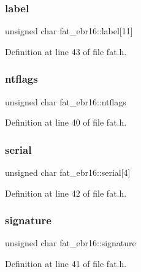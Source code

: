 \subsubsection{\texorpdfstring{label}{label}}
{\footnotesize\ttfamily unsigned char fat\+\_\+ebr16\+::label\mbox{[}11\mbox{]}}



Definition at line 43 of file fat.\+h.

\mbox{\label{a00057_a90f6b7d2156bc0f3d709e82c08a1cad4_a90f6b7d2156bc0f3d709e82c08a1cad4}} 
\subsubsection{\texorpdfstring{ntflags}{ntflags}}
{\footnotesize\ttfamily unsigned char fat\+\_\+ebr16\+::ntflags}



Definition at line 40 of file fat.\+h.

\mbox{\label{a00057_a9f3f3907a47eab25db8ffaacf339848f_a9f3f3907a47eab25db8ffaacf339848f}} 
\subsubsection{\texorpdfstring{serial}{serial}}
{\footnotesize\ttfamily unsigned char fat\+\_\+ebr16\+::serial\mbox{[}4\mbox{]}}



Definition at line 42 of file fat.\+h.

\mbox{\label{a00057_a366424b6b0e4cc2cc3a48fb291cdddf1_a366424b6b0e4cc2cc3a48fb291cdddf1}} 
\subsubsection{\texorpdfstring{signature}{signature}}
{\footnotesize\ttfamily unsigned char fat\+\_\+ebr16\+::signature}



Definition at line 41 of file fat.\+h.

